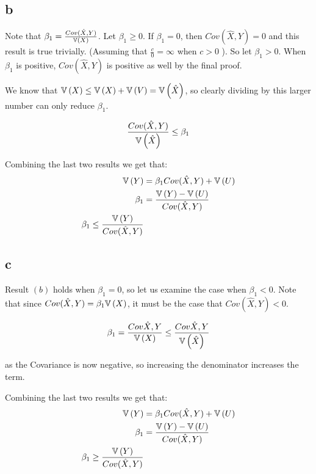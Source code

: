 \documentclass[12pt]{paper}
\begin{document}
\subsection*{b}

Note that $\beta_1 = \frac{Cov(\hat{X},Y)}{\mathbb{V} \left ( X \right )}$. Let $\beta_1 \geq 0$. If
$\beta_1 = 0$, then $Cov( \hat{X}, Y) = 0$  and this result is true
trivially. (Assuming that $\frac{c}{0}= \infty$ when $c > 0$ ). So let $\beta_1
> 0$. When $\beta_1$ is positive, $Cov( \hat{X},
Y)$ is positive as well by the final proof.

We know that $\mathbb{V} \left ( X \right ) \leq \mathbb{V} \left ( X \right ) + \mathbb{V} \left ( V \right ) = \mathbb{V} \left ( \hat{X} \right )$, so
clearly dividing by this larger number can only reduce $\beta_1$.

\begin{equation*}
  \frac{Cov( \hat{X}, Y)}{\mathbb{V} \left ( \hat{X} \right )} \leq \beta_1
\end{equation*}

Combining the last two results we get that:
\begin{align*}
  \mathbb{V} \left ( Y \right ) &= \beta_1 Cov( \hat{X}, Y) + \mathbb{V} \left ( U \right )\\
  \beta_1 &= \frac{\mathbb{V} \left ( Y \right ) - \mathbb{V} \left ( U \right )}{Cov( \hat{X}, Y)}\\
  \beta_1 \leq \frac{\mathbb{V} \left ( Y \right )}{Cov( \hat{X}, Y)}
\end{align*}


\subsection*{c}

Result $(b)$ holds when $\beta_1 = 0$, so let us examine the case when
$\beta_1 < 0$. Note that since $Cov(\hat{X},Y) = \beta_1 \mathbb{V} \left ( X \right )$, it must be
the case that $Cov( \hat{X},Y) < 0$.

\begin{equation*}
  \beta_1 = \frac{Cov{\hat{X},Y}}{\mathbb{V} \left ( X \right )} \leq \frac{Cov{\hat{X},Y}}{\mathbb{V} \left ( \hat{X} \right )}
\end{equation*}

as the Covariance is now negative, so increasing the denominator
increases the term.

Combining the last two results we get that:
\begin{align*}
  \mathbb{V} \left ( Y \right ) &= \beta_1 Cov( \hat{X}, Y) + \mathbb{V} \left ( U \right )\\
  \beta_1 &= \frac{\mathbb{V} \left ( Y \right ) - \mathbb{V} \left ( U \right )}{Cov( \hat{X}, Y)}\\
  \beta_1 \geq \frac{\mathbb{V} \left ( Y \right )}{Cov( \hat{X}, Y)}
\end{align*}
\end{document}
